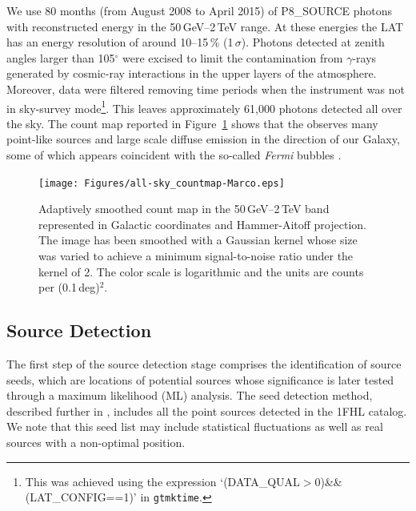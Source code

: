 We use 80 months (from August 2008 to April 2015) of P8\_SOURCE 
photons with reconstructed energy in the 50\,GeV--2\,TeV range.
At these energies the LAT has an energy resolution of around 10--15\,\% (1\,$\sigma$).
Photons detected at zenith angles larger than 105$^{\circ}$ were excised
to limit the contamination from $\gamma$-rays generated by cosmic-ray
interactions in the upper layers of the atmosphere. Moreover, data were filtered
removing time periods when the instrument was not in sky-survey mode\footnote{This
	was achieved using the expression `(DATA\_QUAL$>$0)\&\&(LAT\_CONFIG==1)' in {\tt gtmktime}.}.
This leaves
approximately 61,000 photons detected all over the sky. The count map
reported in Figure~\ref{fig:skymap} shows that the \lat{} observes
many point-like sources and
large scale diffuse emission in the direction of our Galaxy, some of which appears
coincident  with the so-called {\it Fermi} bubbles \citep{su10,lat_bubbles}.



\begin{figure}[!ht]
	\begin{centering} 
		\texttt{[image: Figures/all-sky\_countmap-Marco.eps]}
		\caption{Adaptively smoothed count map in the 50\,GeV--2\,TeV band represented in Galactic coordinates and Hammer-Aitoff projection. The image has been smoothed with a Gaussian kernel whose size was varied to achieve a minimum signal-to-noise ratio under the kernel of 2. The color scale is logarithmic and the units are counts per (0.1\,deg)$^2$.
			\label{fig:skymap}}
	\end{centering}
\end{figure}


\subsection{\label{2fhl:sourceDetect}Source Detection}


The first step of the source detection stage comprises the identification of source seeds, which are locations of potential sources whose significance is later tested through a maximum likelihood (ML) analysis. The seed detection method, described further in \cite{2FHL}, includes all the point sources detected in the 1FHL catalog. We note that  this seed list may include statistical fluctuations as well as real sources with a non-optimal position.


